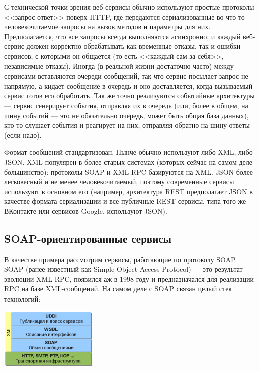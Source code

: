 \documentclass[a5paper]{article}
\begin{document}
С технической точки зрения веб-сервисы обычно используют простые протоколы <<запрос-ответ>> поверх HTTP, где передаются сериализованные во что-то человекочитаемое запросы на вызов методов и параметры для них. Предполагается, что все запросы всегда выполняются асинхронно, и каждый веб-сервис должен корректно обрабатывать как временные отказы, так и ошибки сервисов, с которыми он общается (то есть <<каждый сам за себя>>, независимые отказы). Иногда (в реальной жизни достаточно часто) между сервисами вставляются очереди сообщений, так что сервис посылает запрос не напрямую, а кидает сообщение в очередь и оно доставляется, когда вызываемый сервис готов его обработать. Так же точно реализуются событийные архитектуры --- сервис генерирует события, отправляя их в очередь (или, более в общем, на шину событий --- это не обязательно очередь, может быть общая база данных), кто-то слушает события и реагирует на них, отправляя обратно на шину ответы (если надо).

Формат сообщений стандартизован. Нынче обычно используют либо XML, либо JSON. XML популярен в более старых системах (которых сейчас на самом деле большинство): протоколы SOAP и XML-RPC базируются на XML. JSON более легковесный и не менее человекочитаемый, поэтому современные сервисы используют в основном его (например, архитектура REST предполагает JSON в качестве формата сериализации и все публичные REST-сервисы, типа того же ВКонтакте или сервисов Google, используют JSON).

\subsection{SOAP-ориентированные сервисы}

В качестве примера рассмотрим сервисы, работающие по протоколу SOAP. SOAP (ранее известный как Simple Object Access Protocol) --- это результат эволюции XML-RPC, появился аж в 1998 году и предназначался для реализации RPC на базе XML-сообщений. На самом деле с SOAP связан целый стек технологий:

\begin{center}
    \includegraphics[width=0.35\textwidth]{soap.png}
\end{center}
\end{document}
